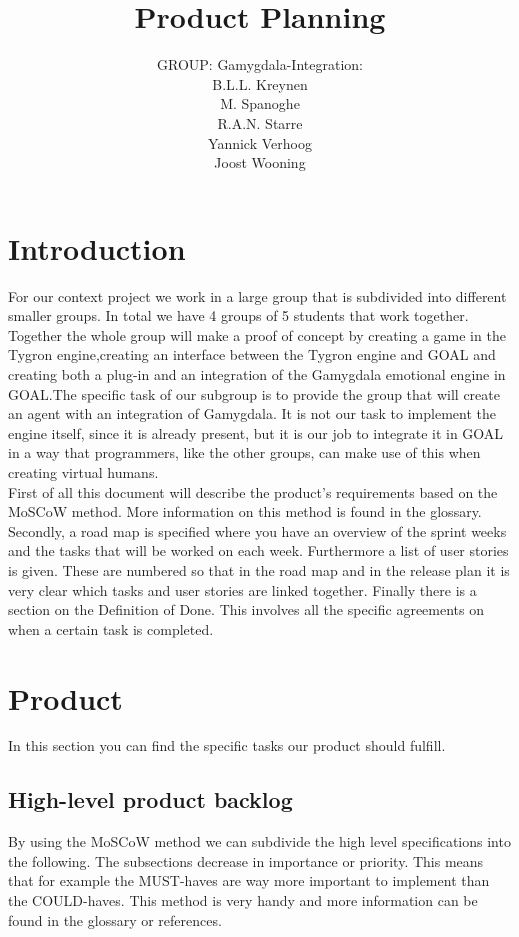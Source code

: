 \documentclass[]{article}
\title{Product Planning}
\author{GROUP: Gamygdala-Integration:\\
	B.L.L. Kreynen\\
	M. Spanoghe\\
	R.A.N. Starre\\
	Yannick Verhoog\\
	Joost Wooning\\
	}
\begin{document}
\maketitle
\pagebreak
\tableofcontents
\pagebreak
\section{Introduction}
For our context project we work in a large group that is subdivided into different smaller groups. In total we have 4 groups of 5 students that work together. Together the whole group will make a proof of concept by creating a game in the Tygron engine\cite{Tygron},creating an interface between the Tygron engine and \gls{GOAL} and creating both a plug-in and an integration of the \gls{Gamygdala} emotional engine in GOAL.The specific task of our subgroup is to provide the group that will create an agent with an integration of Gamygdala. It is not our task to implement the engine itself, since it is already present, but it is our job to integrate it in GOAL in a way that programmers, like the other groups, can make use of this when creating virtual humans.
\\
First of all this document will describe the product's requirements based on the MoSCoW method. More information on this method is found in the glossary. Secondly, a road map is specified where you have an overview of the sprint weeks and the tasks that will be worked on each week. Furthermore a list of user stories is given. These are numbered so that in the road map and in the release plan it is very clear which tasks and user stories are linked together. Finally there is a section on the Definition of Done. This involves all the specific agreements on when a certain task is completed. 
\section{Product}
In this section you can find the specific tasks our product should fulfill.
\subsection{High-level product backlog}
By using the \gls{MoSCoW} method we can subdivide the high level specifications into the following. The subsections decrease in importance or priority. This means that for example the MUST-haves are way more important to implement than the COULD-haves. This method is very handy and more information can be found in the glossary or references.
\end{document}

